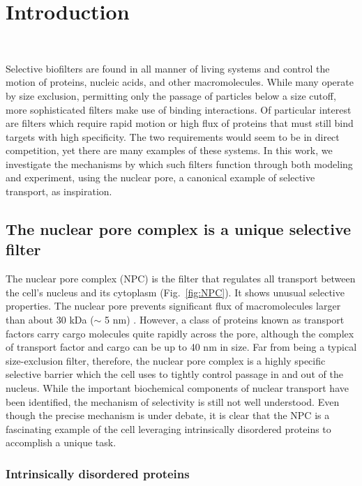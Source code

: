 \chapter{Introduction}~\label{ch01_introduction}

Selective biofilters are found in all manner of living systems and control the motion of proteins, nucleic acids, and other macromolecules.  While many operate by size exclusion, permitting only the passage of particles below a size cutoff, more sophisticated filters make use of binding interactions.  Of particular interest are filters which require rapid motion or high flux of proteins that must still bind targets with high specificity.  The two requirements would seem to be in direct competition, yet there are many examples of these systems.  In this work, we investigate the mechanisms by which such filters function through both modeling and experiment, using the nuclear pore, a canonical example of selective transport, as inspiration.

\section{The nuclear pore complex is a unique selective filter}

The nuclear pore complex (NPC) is the filter that regulates all transport between the cell's nucleus and its cytoplasm (Fig.~\ref{fig:NPC}).  It shows unusual selective properties. The nuclear pore prevents significant flux of macromolecules larger than about 30 kDa ($\sim$ 5 nm) \cite{timney16}.  However, a class of proteins known as transport factors carry cargo molecules quite rapidly across the pore, although the complex of transport factor and cargo can be up to 40 nm in size.  Far from being a typical size-exclusion filter, therefore, the nuclear pore complex is a highly specific selective barrier which the cell uses to tightly control passage in and out of the nucleus. While the important biochemical components of nuclear transport have been identified, the mechanism of selectivity is still not well understood.  Even though the precise mechanism is under debate, it is clear that the NPC is a fascinating example of the cell leveraging intrinsically disordered proteins to accomplish a unique task.

\subsection{Intrinsically disordered proteins}

